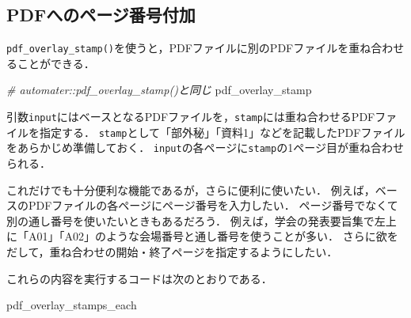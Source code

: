 \documentclass[
]{article}
\newenvironment{Shaded}{\begin{snugshade}}{\end{snugshade}}
\newcommand{\CommentTok}[1]{\textcolor[rgb]{0.56,0.35,0.01}{\textit{#1}}}
\newcommand{\NormalTok}[1]{#1}
\begin{document}
\hypertarget{pdfux3078ux306eux30daux30fcux30b8ux756aux53f7ux4ed8ux52a0}{%
\subsection{PDFへのページ番号付加}\label{pdfux3078ux306eux30daux30fcux30b8ux756aux53f7ux4ed8ux52a0}}

\texttt{pdf\_overlay\_stamp()}を使うと，PDFファイルに別のPDFファイルを重ね合わせることができる．

\begin{Shaded}
\begin{Highlighting}[]
  \CommentTok{\# automater::pdf\_overlay\_stamp()と同じ}
\NormalTok{pdf\_overlay\_stamp}
\end{Highlighting}
\end{Shaded}

引数\texttt{input}にはベースとなるPDFファイルを，\texttt{stamp}には重ね合わせるPDFファイルを指定する．
\texttt{stamp}として「部外秘」「資料1」などを記載したPDFファイルをあらかじめ準備しておく．
\texttt{input}の各ページに\texttt{stamp}の1ページ目が重ね合わせられる．

これだけでも十分便利な機能であるが，さらに便利に使いたい．
例えば，ベースのPDFファイルの各ページにページ番号を入力したい．
ページ番号でなくて別の通し番号を使いたいときもあるだろう．
例えば，学会の発表要旨集で左上に「A01」「A02」のような会場番号と通し番号を使うことが多い．
さらに欲をだして，重ね合わせの開始・終了ページを指定するようにしたい．

これらの内容を実行するコードは次のとおりである．

\begin{Shaded}
\begin{Highlighting}[]
\NormalTok{pdf\_overlay\_stamps\_each}
\end{Highlighting}
\end{Shaded}
\end{document}
